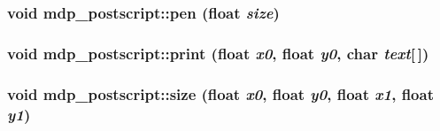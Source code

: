 \hypertarget{classmdp__postscript_a416d831d67bb6db2512f3e819eee8bf3}{
\subsubsection[{pen}]{\setlength{\rightskip}{0pt plus 5cm}void mdp\_\-postscript::pen (float {\em size})}}
\label{classmdp__postscript_a416d831d67bb6db2512f3e819eee8bf3}
\hypertarget{classmdp__postscript_a0c67b14a365475f3b5b04d3d033cc4c4}{
\subsubsection[{print}]{\setlength{\rightskip}{0pt plus 5cm}void mdp\_\-postscript::print (float {\em x0}, \/  float {\em y0}, \/  char {\em text}\mbox{[}$\,$\mbox{]})}}
\label{classmdp__postscript_a0c67b14a365475f3b5b04d3d033cc4c4}
\hypertarget{classmdp__postscript_af62e32c26c084b83e1a6c318767f2192}{
\subsubsection[{size}]{\setlength{\rightskip}{0pt plus 5cm}void mdp\_\-postscript::size (float {\em x0}, \/  float {\em y0}, \/  float {\em x1}, \/  float {\em y1})}}
\label{classmdp__postscript_af62e32c26c084b83e1a6c318767f2192}


